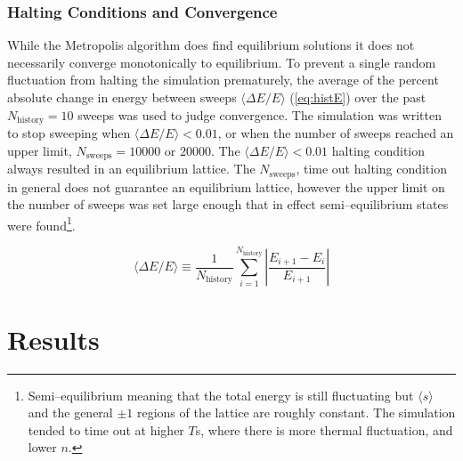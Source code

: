 \documentclass[notitlepage,aps,prd,nofootinbib]{revtex4-1}
\begin{document}
\subsubsection{Halting Conditions and Convergence}
\label{subsubsec:convergence}
While the Metropolis algorithm does find equilibrium solutions it does not necessarily converge monotonically to equilibrium. To prevent a single random fluctuation from halting the simulation prematurely, the average of the percent absolute change in energy between sweeps $\langle \Delta E / E \rangle$ (\ref{eq:histE}) over the past $N_{\mathrm{history}} = 10$ sweeps was used to judge convergence. The simulation was written to stop sweeping when $\langle \Delta E / E \rangle < 0.01$, or when the number of sweeps reached an upper limit, $N_{\mathrm{sweeps}} = 10000$ or $20000$. The $\langle \Delta E / E \rangle < 0.01$ halting condition always resulted in an equilibrium lattice. The $N_{\mathrm{sweeps}}$, time out halting condition in general does not guarantee an equilibrium lattice, however the upper limit on the number of sweeps was set large enough that in effect semi--equilibrium states were found\footnote{Semi--equilibrium meaning that the total energy is still fluctuating but $\langle s \rangle$ and the general $\pm1$ regions of the lattice are roughly constant. The simulation tended to time out at higher $T$s, where there is more thermal fluctuation, and lower $n$.}.


\begin{equation}
\label{eq:histE}
\langle \Delta E / E \rangle \equiv \frac{1}{N_{\mathrm{history}}} \sum_{i=1}^{N_{\mathrm{history}}} \left|\frac{ E_{i+1} - E_{i}}{E_{i+1}}\right|
\end{equation}


\clearpage
\section{Results}
\label{sec:results}
\end{document}
